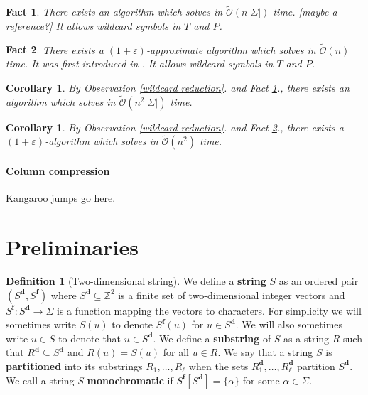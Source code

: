 \documentclass[11pt]{article}
\newcommand{\Z}{\mathbb{Z}}
\newcommand{\tO}{\tilde{\mathcal{O}}}
\newcommand{\set}[1]{\lbrace #1 \rbrace}
\theoremstyle{plain}
\newtheorem{corollary}[theorem]{Corollary}
\newtheorem{fact}{Fact}
\theoremstyle{definition}
\newtheorem{definition}{Definition}
\begin{document}
\begin{fact}\label{sigman}
	There exists an algorithm which solves \hd in $\tO(n|\Sigma|)$ time.
	[maybe a reference?]
	It allows wildcard symbols in $T$ and $P$. 
\end{fact}

\begin{fact}\label{approx}
	There exists a $(1 + \varepsilon)$-approximate algorithm which solves \hd in $\tO(n)$ time.
	It was first introduced in \cite{Karloff1993}.
	It allows wildcard symbols in $T$ and $P$.
\end{fact}

\begin{corollary}
	By Observation \ref{wildcard reduction}. and Fact \ref{sigman}., there exists an algorithm which solves \HD in $\tO(n^2|\Sigma|)$ time.
\end{corollary}


\begin{corollary}
	By Observation \ref{wildcard reduction}. and Fact \ref{approx}., there exists a $(1 + \varepsilon)$-algorithm which solves \HD in $\tO(n^2)$ time.
\end{corollary}

\paragraph{Column compression}
Kangaroo jumps go here.



\section{Preliminaries}

\renewcommand{\d}[1]{#1^\mathbf{d}}
\newcommand{\f}[1]{#1^\mathbf{f}}
\begin{definition}[Two-dimensional string]
	We define a \textbf{string} $S$ as an ordered pair $(\d{S}, \f{S})$ where $\d{S} \subseteq \Z^2$ is a finite set of two-dimensional integer vectors and $\f{S} : \d{S} \to \Sigma$
	is a function mapping the vectors to characters.
	For simplicity we will sometimes write $S(u)$ to denote $\f{S}(u)$ for $u \in \d{S}$.
	We will also sometimes write $u \in S$ to denote that $u \in \d{S}$.
	We define a \textbf{substring} of $S$ as a string $R$ such that $\d{R} \subseteq \d{S}$ and $R(u) = S(u)$ for all $u \in R$.
	We say that a string $S$ is \textbf{partitioned} into its substrings $R_1, \dots, R_\ell$ when the sets $\d{R_1}, \dots, \d{R_\ell}$ partition $\d{S}$.
	We call a string $S$ \textbf{monochromatic} if $\f{S}[\d{S}] = \set{\alpha}$ for some $\alpha \in \Sigma$.
\end{definition}
\end{document}

